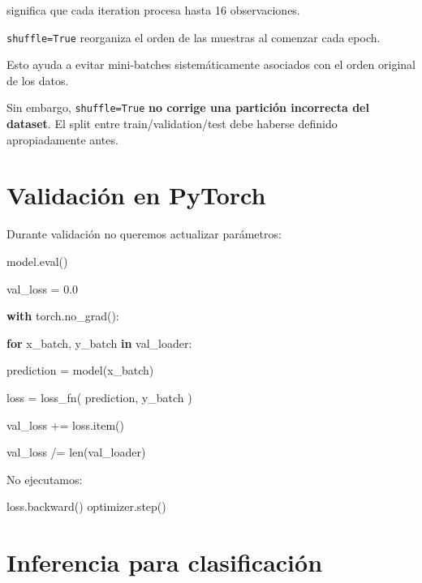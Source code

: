 \documentclass[
  letterpaper,
  DIV=11,
  numbers=noendperiod]{scrartcl}
\newenvironment{Shaded}{\begin{snugshade}}{\end{snugshade}}
\newcommand{\BuiltInTok}[1]{\textcolor[rgb]{0.00,0.23,0.31}{#1}}
\newcommand{\ControlFlowTok}[1]{\textcolor[rgb]{0.00,0.23,0.31}{\textbf{#1}}}
\newcommand{\FloatTok}[1]{\textcolor[rgb]{0.68,0.00,0.00}{#1}}
\newcommand{\KeywordTok}[1]{\textcolor[rgb]{0.00,0.23,0.31}{\textbf{#1}}}
\newcommand{\NormalTok}[1]{\textcolor[rgb]{0.00,0.23,0.31}{#1}}
\newcommand{\OperatorTok}[1]{\textcolor[rgb]{0.37,0.37,0.37}{#1}}
\begin{document}
significa que cada iteration procesa hasta 16 observaciones.

\texttt{shuffle=True} reorganiza el orden de las muestras al comenzar
cada epoch.

Esto ayuda a evitar mini-batches sistemáticamente asociados con el orden
original de los datos.

Sin embargo, \texttt{shuffle=True} \textbf{no corrige una partición
incorrecta del dataset}. El split entre train/validation/test debe
haberse definido apropiadamente antes.

\section{Validación en PyTorch}\label{validaciuxf3n-en-pytorch}

Durante validación no queremos actualizar parámetros:

\begin{Shaded}
\begin{Highlighting}[]
\NormalTok{model.}\BuiltInTok{eval}\NormalTok{()}

\NormalTok{val\_loss }\OperatorTok{=} \FloatTok{0.0}

\ControlFlowTok{with}\NormalTok{ torch.no\_grad():}

    \ControlFlowTok{for}\NormalTok{ x\_batch, y\_batch }\KeywordTok{in}\NormalTok{ val\_loader:}

\NormalTok{        prediction }\OperatorTok{=}\NormalTok{ model(x\_batch)}

\NormalTok{        loss }\OperatorTok{=}\NormalTok{ loss\_fn(}
\NormalTok{            prediction,}
\NormalTok{            y\_batch}
\NormalTok{        )}

\NormalTok{        val\_loss }\OperatorTok{+=}\NormalTok{ loss.item()}

\NormalTok{val\_loss }\OperatorTok{/=} \BuiltInTok{len}\NormalTok{(val\_loader)}
\end{Highlighting}
\end{Shaded}

No ejecutamos:

\begin{Shaded}
\begin{Highlighting}[]
\NormalTok{loss.backward()}
\NormalTok{optimizer.step()}
\end{Highlighting}
\end{Shaded}

\section{Inferencia para
clasificación}\label{inferencia-para-clasificaciuxf3n}
\end{document}

